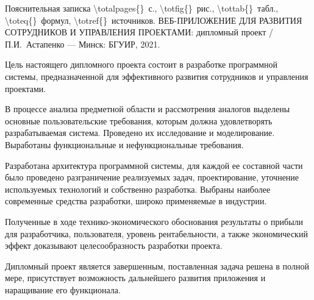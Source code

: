 \thispagestyle{empty}


\begin{center}
    Пояснительная записка \num{\totalpages{}}~с., \num{\totfig{}}~рис., \num{\tottab{}}~табл., \num{\toteq{}}~формул, \num{\totref{}}~источников.
	\MakeUppercase{Веб-приложение для развития сотрудников и управления проектами}: дипломный проект / П.И.~Астапенко — Минск: БГУИР, 2021.
\end{center}

Цель настоящего дипломного проекта состоит в разработке программной системы, предназначенной для эффективного развития сотрудников и управления проектами.

В процессе анализа предметной области и рассмотрения аналогов выделены основные пользовательские требования, которым должна удовлетворять разрабатываемая система. Проведено их исследование и моделирование. Выработаны функциональные и нефункциональные требования.

Разработана архитектура программной системы, для каждой ее составной части было проведено разграничение реализуемых задач, проектирование, уточнение используемых технологий и собственно разработка. Выбраны наиболее современные средства разработки, широко применяемые в индустрии. 

Полученные в ходе технико-экономического обоснования результаты о прибыли для разработчика, пользователя, уровень рентабельности, а также экономический эффект доказывают целесообразность разработки проекта.

Дипломный проект является завершенным, поставленная задача решена в полной мере, присутствует возможность дальнейшего развития приложения и наращивание его функционала.

